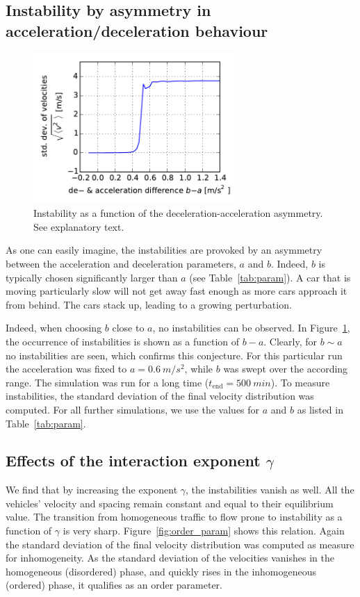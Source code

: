 \subsection{Instability by asymmetry in acceleration/deceleration behaviour}
\label{sec:asymm}

\begin{figure}
    \centering
    \includegraphics[width=3in]{../img/order_parameter_delta_acceleration.pdf}
    \caption{Instability as a function of the deceleration-acceleration asymmetry. See explanatory text.}
    \label{fig:order_parameter_delta_acceleration}
\end{figure}
As one can easily imagine, the instabilities are provoked by an asymmetry between the acceleration and deceleration parameters, $a$ and $b$. Indeed, $b$ is typically chosen significantly larger than $a$ (see Table~\ref{tab:param}). A car that is moving particularly slow will not get away fast enough as more cars approach it from behind. The cars stack up, leading to a growing perturbation.

Indeed, when choosing $b$ close to $a$, no instabilities can be observed. In Figure~\ref{fig:order_parameter_delta_acceleration}, the occurrence of instabilities is shown as a function of $b-a$. Clearly, for $b\sim a$ no instabilities are seen, which confirms this conjecture.
For this particular run the acceleration was fixed to $a=\SI{0.6}{m/s^2}$, while $b$ was swept over the according range. The simulation was run for a long time ($t_\mathrm{end} = \SI{500}{min}$). To measure instabilities, the standard deviation of the final velocity distribution was computed. For all further simulations, we use the values for $a$ and $b$ as listed in Table~\ref{tab:param}.

\subsection{Effects of the interaction exponent $\gamma$}
We find that by increasing the exponent $\gamma$, the instabilities vanish as well. All the vehicles' velocity and spacing remain constant and equal to their equilibrium value. The transition from homogeneous traffic to flow prone to instability as a function of $\gamma$ is very sharp. Figure~\ref{fig:order_param} shows this relation. Again the standard deviation of the final velocity distribution was computed as measure for inhomogeneity. As the standard deviation of the velocities vanishes in the homogeneous (disordered) phase, and quickly rises in the inhomogeneous (ordered) phase, it qualifies as an order parameter.

